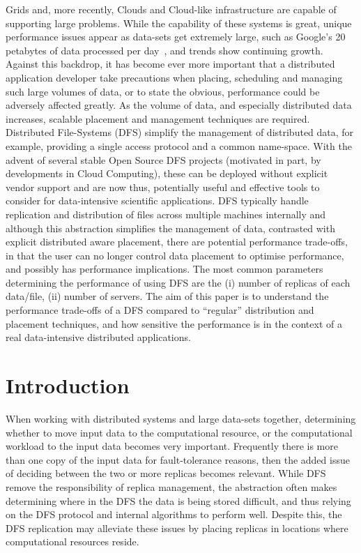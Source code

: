 \documentclass[a4paper,11pt]{article}
\begin{document}
Grids and, more recently, Clouds and Cloud-like infrastructure are
capable of supporting large problems. While the capability of these
systems is great, unique performance issues appear as data-sets get
extremely large, such as Google's 20 petabytes of data processed per
day~\cite{google}, and trends show continuing growth. Against this
backdrop, it has become ever more important that a distributed
application developer take precautions when placing, scheduling and
managing such large volumes of data, or to state the obvious,
performance could be adversely affected greatly. As the volume of data,
and especially distributed data increases, scalable placement and
management techniques are required.  Distributed File-Systems (DFS)
simplify the management of distributed data, for example, providing a
single access protocol and a common name-space. With the advent of
several stable Open Source DFS projects (motivated in part, by
developments in Cloud Computing), these can be deployed without explicit
vendor support and are now thus, potentially useful and effective tools
to consider for data-intensive scientific applications.  DFS typically
handle replication and distribution of files across multiple machines
internally and although this abstraction simplifies the management of
data, contrasted with explicit distributed aware placement, there are
potential performance trade-offs, in that the user can no longer control
data placement to optimise performance, and possibly has performance
implications.  The most common parameters determining the performance of
using DFS are the (i) number of replicas of each data/file, (ii) number
of servers. The aim of this paper is to understand the performance
trade-offs of a DFS compared to ``regular'' distribution and placement
techniques, and how sensitive the performance is in the context of a
real data-intensive distributed applications.

\section{Introduction} When working with distributed systems and large
data-sets together, determining whether to move input data to the
computational resource, or the computational workload to the input data
becomes very important. Frequently there is more than one copy of the
input data for fault-tolerance reasons, then the added issue of deciding
between the two or more replicas becomes relevant. While DFS remove the
responsibility of replica management, the abstraction often makes
determining where in the DFS the data is being stored difficult, and
thus relying on the DFS protocol and internal algorithms to perform
well. Despite this, the DFS replication may alleviate these issues by
placing replicas in locations where computational resources reside.
\end{document}
